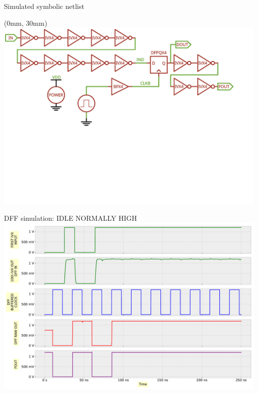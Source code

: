\begin{frame}{Simulated symbolic netlist}
	\centering
	\vspace{15mm}
    \begin{textblock*}{145mm}(0mm, 30mm)
		\includegraphics[width=1.0\textwidth]{./figures/dff_ivx_chain.pdf}
	\end{textblock*}
\end{frame}

\begin{frame}{DFF simulation: IDLE NORMALLY HIGH}
	\centering
	\vspace{2mm}
	\includegraphics[width=\textwidth]{./figures/DFPX4_idle_nLow.pdf}
\end{frame}

